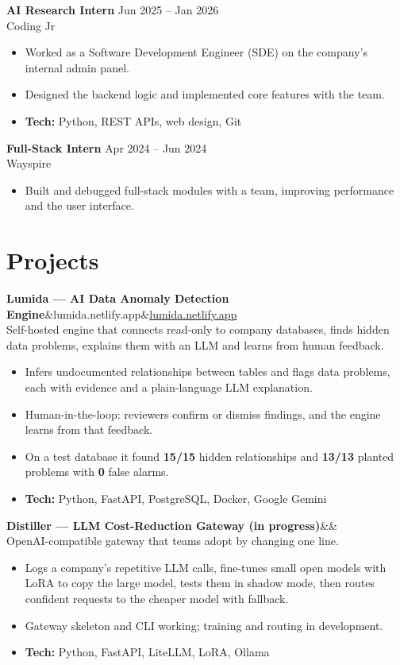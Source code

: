\documentclass[10pt,a4paper]{article}
\newcommand{\role}[3]{%
  \textbf{#1} \hfill {\color{muted}\small #3}\\
  {\color{muted}#2}\par\vspace{1pt}}
\newcommand{\project}[3]{%
  \textbf{#1}\ifx&#3&\else\hfill{\small\href{https://#3}{#3}}\fi\\
  {\color{muted}\small #2}\par\vspace{1pt}}
\newcommand{\tech}[1]{{\small\textbf{Tech:} #1}}
\begin{document}
\role{AI Research Intern}{Coding Jr}{Jun 2025 -- Jan 2026}
\begin{itemize}
  \item Worked as a Software Development Engineer (SDE) on the company's internal admin panel.
  \item Designed the backend logic and implemented core features with the team.
  \item \tech{Python, REST APIs, web design, Git}
\end{itemize}
\vspace{4pt}

\role{Full-Stack Intern}{Wayspire}{Apr 2024 -- Jun 2024}
\begin{itemize}
  \item Built and debugged full-stack modules with a team, improving performance and the user interface.
\end{itemize}

\section{Projects}
\project{Lumida --- AI Data Anomaly Detection Engine}{Self-hosted engine that connects read-only to company databases, finds hidden data problems, explains them with an LLM and learns from human feedback.}{lumida.netlify.app}
\begin{itemize}
  \item Infers undocumented relationships between tables and flags data problems, each with evidence and a plain-language LLM explanation.
  \item Human-in-the-loop: reviewers confirm or dismiss findings, and the engine learns from that feedback.
  \item On a test database it found \textbf{15/15} hidden relationships and \textbf{13/13} planted problems with \textbf{0} false alarms.
  \item \tech{Python, FastAPI, PostgreSQL, Docker, Google Gemini}
\end{itemize}
\vspace{4pt}

\project{Distiller --- LLM Cost-Reduction Gateway (in progress)}{OpenAI-compatible gateway that teams adopt by changing one line.}{}
\begin{itemize}
  \item Logs a company's repetitive LLM calls, fine-tunes small open models with LoRA to copy the large model, tests them in shadow mode, then routes confident requests to the cheaper model with fallback.
  \item Gateway skeleton and CLI working; training and routing in development.
  \item \tech{Python, FastAPI, LiteLLM, LoRA, Ollama}
\end{itemize}
\vspace{4pt}
\end{document}
